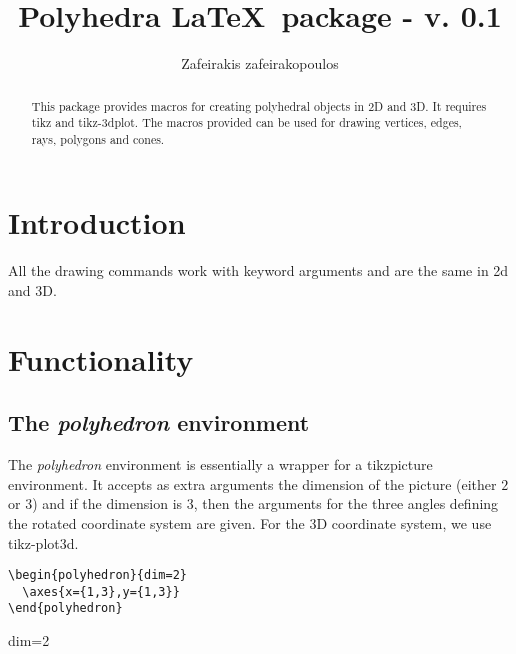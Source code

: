 \documentclass[a4paper,10pt]{article}
\begin{document}



\title{Polyhedra \LaTeX\ package - v. 0.1}
\author{Zafeirakis zafeirakopoulos}
\maketitle
\begin{abstract}
This package provides macros for creating polyhedral objects in 2D and 3D.
It requires tikz and tikz-3dplot.
The macros provided can be used for drawing vertices, edges, rays, polygons and
cones.
\end{abstract}

\section{Introduction}


All the drawing commands work with keyword arguments and are the same in
2d and 3D.



\section{Functionality}

\subsection{The \emph{polyhedron} environment}

The \emph{polyhedron} environment is essentially a wrapper for a tikzpicture
environment.
It accepts as extra arguments the dimension of the picture (either $2$ or $3$)
and if the dimension is $3$, then the arguments for the three angles defining
the rotated coordinate system are given.
For the 3D coordinate system, we use tikz-plot3d.

\begin{center}
  \begin{minipage}{0.6\textwidth}
  \begin{lstlisting}
\begin{polyhedron}{dim=2}
  \axes{x={1,3},y={1,3}}
\end{polyhedron}
  \end{lstlisting}
  \end{minipage}
  \qquad\qquad
  \begin{minipage}{0.2\textwidth}
    \begin{polyhedron}{dim=2}
    \end{polyhedron}
  \end{minipage}
\end{center}
\end{document}
